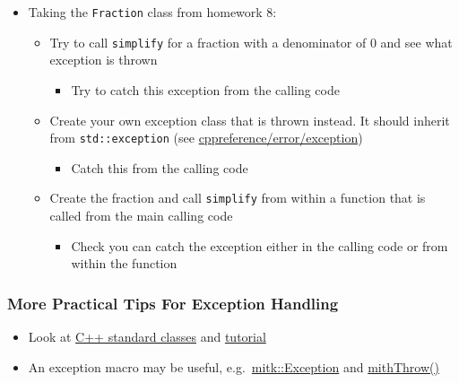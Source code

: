 \begin{itemize}
\tightlist
\item
  Taking the \texttt{Fraction} class from homework 8:

  \begin{itemize}
  \tightlist
  \item
    Try to call \texttt{simplify} for a fraction with a denominator of 0
    and see what exception is thrown

    \begin{itemize}
    \tightlist
    \item
      Try to catch this exception from the calling code
    \end{itemize}
  \item
    Create your own exception class that is thrown instead. It should
    inherit from \texttt{std::exception} (see
    \href{https://en.cppreference.com/w/cpp/error/exception}{cppreference/error/exception})

    \begin{itemize}
    \tightlist
    \item
      Catch this from the calling code
    \end{itemize}
  \item
    Create the fraction and call \texttt{simplify} from within a
    function that is called from the main calling code

    \begin{itemize}
    \tightlist
    \item
      Check you can catch the exception either in the calling code or
      from within the function
    \end{itemize}
  \end{itemize}
\end{itemize}

\hypertarget{more-practical-tips-for-exception-handling}{%
\subsubsection{More Practical Tips For Exception
Handling}\label{more-practical-tips-for-exception-handling}}

\begin{itemize}
\tightlist
\item
  Look at \href{http://www.cplusplus.com/reference/exception/}{C++
  standard classes} and
  \href{http://www.cplusplus.com/doc/tutorial/exceptions/}{tutorial}
\item
  An exception macro may be useful,
  e.g.~\href{https://github.com/MITK/MITK/blob/master/Modules/Core/include/mitkException.h}{mitk::Exception}
  and
  \href{https://github.com/MITK/MITK/blob/master/Modules/Core/include/mitkExceptionMacro.h}{mithThrow()}
\end{itemize}

